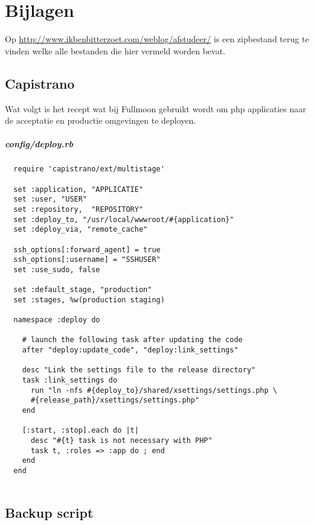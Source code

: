 \chapter{Bijlagen}

Op \href{http://www.ikbenbitterzoet.com/weblog/afstudeer/}{http://www.ikbenbitterzoet.com/weblog/afstudeer/} is een zipbestand terug te vinden welke alle bestanden die hier vermeld worden bevat.

\section{Capistrano}

Wat volgt is het recept wat bij Fullmoon gebruikt wordt om php applicaties naar de acceptatie en productie omgevingen te deployen.

\paragraph{config/deploy.rb}

\begin{verbatim}
  require 'capistrano/ext/multistage'

  set :application, "APPLICATIE"
  set :user, "USER"
  set :repository,  "REPOSITORY"
  set :deploy_to, "/usr/local/wwwroot/#{application}"
  set :deploy_via, "remote_cache"

  ssh_options[:forward_agent] = true
  ssh_options[:username] = "SSHUSER"
  set :use_sudo, false

  set :default_stage, "production"
  set :stages, %w(production staging)

  namespace :deploy do

    # launch the following task after updating the code
    after "deploy:update_code", "deploy:link_settings"

    desc "Link the settings file to the release directory"
    task :link_settings do
      run "ln -nfs #{deploy_to}/shared/xsettings/settings.php \
      #{release_path}/xsettings/settings.php"
    end

    [:start, :stop].each do |t|
      desc "#{t} task is not necessary with PHP"
      task t, :roles => :app do ; end
    end
  end
  
\end{verbatim}

\section{Backup script}

